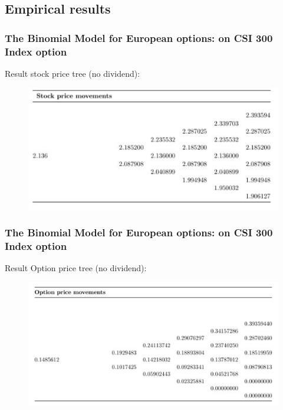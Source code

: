 \documentclass[unknownkeysallowed]{beamer}
\begin{document}
\subsection{Empirical results}

\begin{frame}
\frametitle{The Binomial Model for European options: on CSI 300 Index option}
Result stock price tree (no dividend):
\vskip 0.10cm
\begin{figure}[]
\includegraphics[scale=1]{stock_price_tree}
\end{figure}
\end{frame}

\begin{frame}
\frametitle{The Binomial Model for European options: on CSI 300 Index option}
Result Option price tree (no dividend):
\vskip 0.10cm
\begin{figure}[]
\includegraphics[scale=0.9]{option_price_tree}
\end{figure}
\end{frame}
\end{document}
